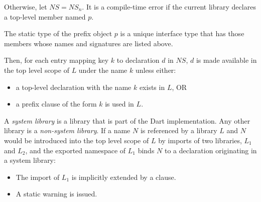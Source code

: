 \documentclass{article}
\begin{document}
\LMHash{}
Otherwise, let $NS = NS_n$.
It is a compile-time error if the current library declares a top-level member named $p$.

The static type of the prefix object $p$ is a unique interface type that has those members whose names and signatures are listed above.


\LMHash{}
Then, for each entry mapping key $k$ to declaration $d$ in $NS$, $d$ is made available in the top level scope of $L$ under the name $k$ unless either:
\begin{itemize}
\item
a top-level declaration with the name $k$ exists in $L$, OR
\item a prefix clause of the form \AS{} $k$ is used in $L$.
\end{itemize}


\LMHash{}
A {\em system library} is a library that is part of the Dart implementation.
Any other library is a {\em non-system library}.
If a name $N$ is referenced by a library $L$ and $N$ would be introduced into the top level scope of $L$ by
imports of two libraries, $L_1$ and $L_2$, and the exported namespace of $L_1$ binds $N$ to a declaration originating in a system library:

\begin{itemize}
\item The import of $L_1$ is implicitly extended by a  clause.
\item A static warning is issued.
\end{itemize}

\end{document}
